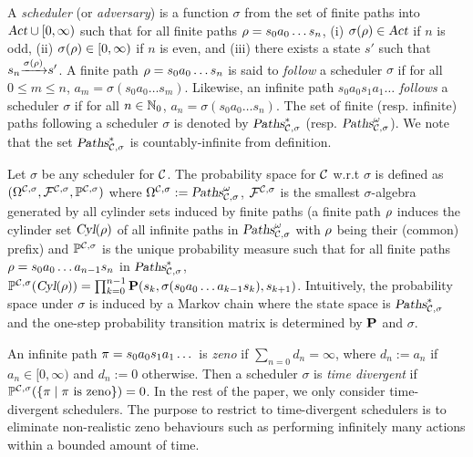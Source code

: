 A \emph{scheduler} (or \emph{adversary}) is a function $\sigma$ from the set of finite paths into $\mbox{\sl Act}\cup [0,\infty)$ such that for all finite paths $\rho=s_0a_0\dots s_n$,
(i) $\sigma(\rho)\in\mbox{\sl Act}$ if $n$ is odd, (ii) $\sigma(\rho)\in  [0,\infty)$ if $n$ is even, and (iii)
there exists a state $s'$ such that ${s_n}{\xrightarrow{\sigma(\rho)}}{s'}$.
A finite path $\rho=s_0a_0\dots s_n$ is said to \emph{follow} a scheduler $\sigma$ if for all $0\le m\le n$, $a_m=\sigma\left(s_0a_0\dots s_m\right)$.
Likewise, an infinite path $s_0a_0s_1a_1\dots$ \emph{follows} a scheduler $\sigma$ if for all $n\in\mathbb{N}_0$, $a_n=\sigma\left(s_0a_0\dots s_n\right)$.
The set of finite (resp. infinite) paths following a scheduler $\sigma$ is denoted by $\mbox{\sl Paths}^*_{\mathcal{C},\sigma}$ (resp. $\mbox{\sl Paths}^\omega_{\mathcal{C},\sigma}$).
We note that the set $\mbox{\sl Paths}^*_{\mathcal{C},\sigma}$ is countably-infinite from definition.

Let $\sigma$ be any scheduler for $\mathcal{C}$.
The probability space for $\mathcal{C}$ w.r.t $\sigma$ is defined as $(\Omega^{\mathcal{C},\sigma}, \mathcal{F}^{\mathcal{C},\sigma}, \mathbb{P}^{\mathcal{C},\sigma})$ where $\Omega^{\mathcal{C},\sigma}:=\mbox{\sl Paths}^\omega_{\mathcal{C},\sigma}$, $\mathcal{F}^{\mathcal{C},\sigma}$ is the smallest $\sigma$-algebra generated by all cylinder sets induced by finite paths (a finite path $\rho$ induces the cylinder set $\mbox{\sl Cyl}(\rho)$ of all infinite paths in $\mbox{\sl Paths}^\omega_{\mathcal{C},\sigma}$ with $\rho$ being their (common) prefix)
and $\mathbb{P}^{\mathcal{C},\sigma}$ is the unique probability measure such that for all finite paths $\rho=s_0a_0\dots a_{n-1}s_n$ in $\mbox{\sl Paths}^*_{\mathcal{C},\sigma}$,
$\mathbb{P}^{\mathcal{C},\sigma}(\mbox{\sl Cyl}(\rho))=\prod_{k=0}^{n-1} \mathbf{P}(s_k, \sigma(s_0a_0\dots a_{k-1}s_k), s_{k+1})$.
Intuitively, the probability space under $\sigma$ is induced by a Markov chain where the state space is $\mbox{\sl Paths}^*_{\mathcal{C},\sigma}$ and the one-step probability transition matrix is determined by $\mathbf{P}$ and $\sigma$.

An infinite path $\pi=s_0a_0s_1a_1\dots$ is \emph{zeno} if $\sum_{n=0} d_n=\infty$, where $d_n:=a_n$ if $a_n\in [0,\infty)$ and $d_n:=0$ otherwise.
Then a scheduler $\sigma$ is \emph{time divergent} if $\mathbb{P}^{\mathcal{C},\sigma}(\{\pi\mid\pi\mbox{ is zeno}\})=0$.
In the rest of the paper, we only consider time-divergent schedulers.
The purpose to restrict to time-divergent schedulers is to eliminate non-realistic zeno behaviours such as performing infinitely many actions within a bounded amount of time.

